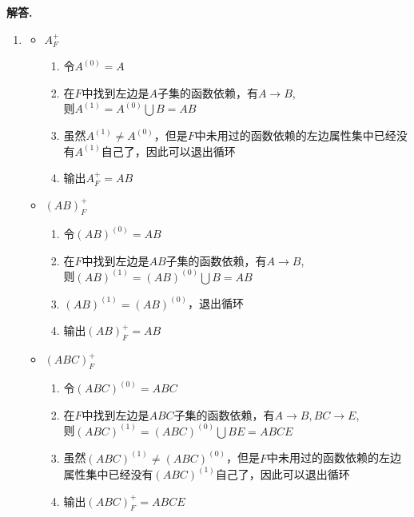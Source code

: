 \documentclass[12pt, a4paper, oneside]{ctexart}
\newenvironment{solution}{\par\noindent\textbf{解答. }}{\par}
\begin{document}
\begin{solution}
    \begin{enumerate}[(1)]
        \item 
            \begin{itemize}
                \item $A_F^+$
                \begin{enumerate}[$1^\circ$]
                    \item 令$A^{(0)} = A$
                    \item 在$F$中找到左边是$A$子集的函数依赖，有$A \rightarrow B$, \\
                    则$A^{(1)} = A^{(0)}\bigcup B = AB$
                    \item 虽然$A^{(1)} \not= A^{(0)}$，但是$F$中未用过的函数依赖的左边属性集中已经没有$A^{(1)}$自己了，因此可以退出循环
                    \item 输出$A_F^+ = AB$
                \end{enumerate}
                \newpage
                \item $(AB)_F^+$
                \begin{enumerate}[$1^\circ$]
                    \item 令$(AB)^{(0)} = AB$
                    \item 在$F$中找到左边是$AB$子集的函数依赖，有$A \rightarrow B$, \\
                    则$(AB)^{(1)} = (AB)^{(0)}\bigcup B = AB$
                    \item $(AB)^{(1)} = (AB)^{(0)}$，退出循环
                    \item 输出$(AB)_F^+ = AB$
                \end{enumerate}
                \item $(ABC)_F^+$
                \begin{enumerate}[$1^\circ$]
                    \item 令$(ABC)^{(0)} = ABC$
                    \item 在$F$中找到左边是$ABC$子集的函数依赖，有$A \rightarrow B, BC \rightarrow E$, \\
                    则$(ABC)^{(1)} = (ABC)^{(0)}\bigcup BE = ABCE$
                    \item 虽然$(ABC)^{(1)} \not= (ABC)^{(0)}$，但是$F$中未用过的函数依赖的左边属性集中已经没有$(ABC)^{(1)}$自己了，因此可以退出循环
                    \item 输出$(ABC)_F^+ = ABCE$
                \end{enumerate}

\end{itemize}
\end{enumerate}
\end{solution}
\end{document}
